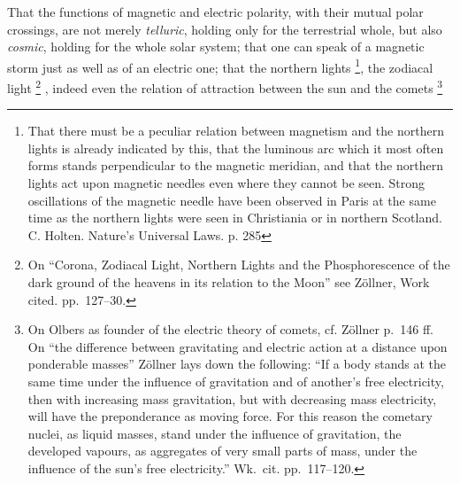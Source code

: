 \documentclass[12pt,a4paper]{book}
\renewcommand{\thefootnote}{*)}
\begin{document}
That the functions of magnetic and electric polarity, with their mutual polar crossings, are not merely \emph{telluric},
holding only for the terrestrial whole, but
also \emph{cosmic}, holding for the whole solar system; that one can speak of a magnetic storm just as well as of an
electric one; that the northern
lights%
\footnote{%
That there must be a peculiar relation between magnetism and the northern lights is already indicated by this, that the
luminous arc which it most often forms stands perpendicular to the magnetic meridian, and that the northern lights act
upon magnetic needles even where they cannot be seen. Strong oscillations of the magnetic needle have been observed in
Paris at the same time as the northern lights were seen in Christiania or in northern Scotland. C. Holten. Nature's
Universal Laws. p. 285}, the zodiacal light%
\renewcommand{\thefootnote}{**)}%
\footnote{%
On ``Corona, Zodiacal Light, Northern Lights and the Phosphorescence of the dark ground of the heavens in its relation to
the Moon'' see Zöllner, Work cited. pp.\ 127--30.}%
\renewcommand{\thefootnote}{***)}%
, indeed even the relation of attraction between the sun and the comets%
\footnote{%
On Olbers as founder of the electric theory of comets, cf. Zöllner p.\ 146 ff. On ``the difference between gravitating
and electric action at a distance upon ponderable masses'' Zöllner lays down the following: ``If a body stands at the
same time under the influence of gravitation and of another's free electricity, then with increasing mass gravitation,
but with decreasing mass electricity, will have the preponderance as moving force. For this reason the cometary nuclei,
as liquid masses, stand under the influence of gravitation, the developed vapours, as aggregates of very small parts of
mass, under the influence of the sun's free electricity.'' Wk.\ cit. pp.\ 117--120.}%
\end{document}
